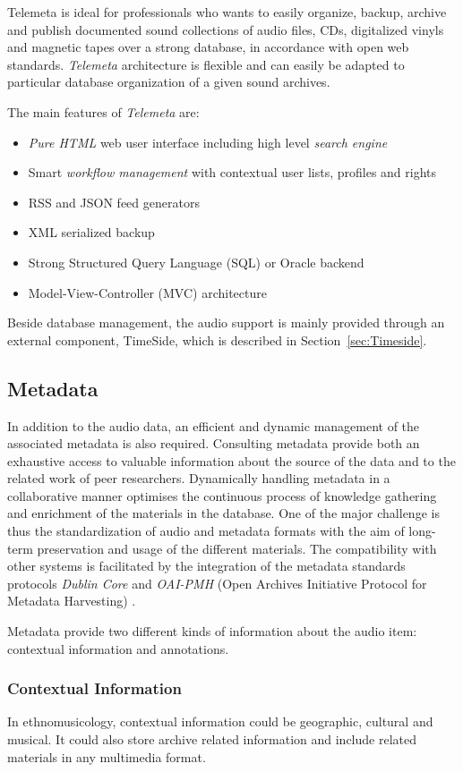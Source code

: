 \documentclass{paper}
\begin{document}
Telemeta is ideal for professionals who wants to easily organize, backup, archive and publish documented sound collections of audio files, CDs, digitalized vinyls and magnetic tapes over a strong database, in accordance with open web standards. 
\emph{Telemeta} architecture is flexible and can easily be adapted to particular database organization of a given sound archives. 

The main features of \emph{Telemeta} are:
\begin{itemize}
\item \emph{Pure HTML} web user interface including high level \emph{search engine}
\item Smart \emph{workflow management} with contextual user lists, profiles and rights
\item RSS and JSON feed generators
\item XML serialized backup
\item Strong Structured Query Language (SQL) or Oracle backend
\item Model-View-Controller (MVC) architecture 
\end{itemize}
Beside database management, the audio support is mainly provided through an external component, TimeSide, which is described in Section~\ref{sec:Timeside}.

\subsection{Metadata}\label{sec:metadata}
In addition to the audio data, an efficient and dynamic management of the associated metadata is also required. Consulting metadata provide both an exhaustive access to valuable information about the source of the data and to the related work of peer researchers. 
Dynamically handling metadata in a collaborative manner optimises the continuous process of knowledge gathering and enrichment of the materials in the database.  
One of the major challenge is thus the standardization of audio and metadata formats with the aim of long-term preservation and usage of the different materials.
The compatibility with other systems is facilitated by the integration of the metadata standards protocols \emph{Dublin Core} and \emph{OAI-PMH} (Open Archives Initiative Protocol for Metadata Harvesting) \cite{DublinCore,OAI-PMH}.

Metadata provide two different kinds of information about the audio item: contextual information and annotations.


\subsubsection{Contextual Information}
In ethnomusicology, contextual information could be geographic, cultural and musical. It could also store archive related information and include related materials in any multimedia format.
\end{document}
